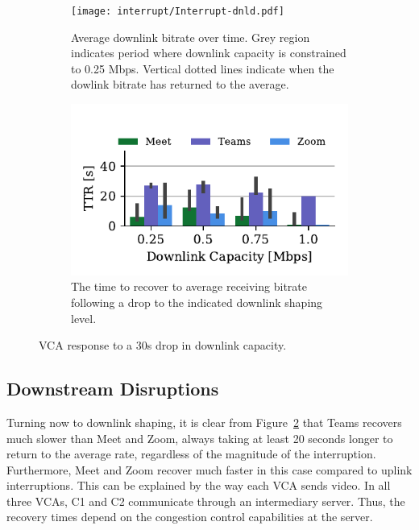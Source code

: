 \begin{figure}[t!]
 \centering
\begin{subfigure}[t]{.5\textwidth}
   \centering
    \texttt{[image: interrupt/Interrupt-dnld.pdf]}
    \caption{Average downlink bitrate over time. Grey region indicates period where downlink capacity is constrained to 0.25 Mbps. Vertical dotted lines indicate when the dowlink bitrate has returned to the average.}
    \label{fig:ts-dnld}
\end{subfigure}
\begin{subfigure}[t]{.5\textwidth}
  \centering
    \includegraphics[width=.9\textwidth,keepaspectratio]{figures/interrupt/TTR-dnld.pdf}
    \caption{The time to recover to average receiving bitrate following a drop to the indicated downlink shaping level.}
    \label{fig:TTR_dnld}
\end{subfigure}
\caption{VCA response to a 30s drop in downlink capacity.}
\label{fig:interrupt-dnld}
\end{figure}

\subsection{Downstream Disruptions}

Turning now to downlink shaping, it is clear from Figure~\ref{fig:TTR_dnld} that Teams recovers much slower than Meet and Zoom, always taking at least 20 seconds longer to return to the average rate, regardless of the magnitude of the interruption. Furthermore, Meet and Zoom recover much faster in this case compared to uplink interruptions. This can be explained by the way each VCA sends video. In all three VCAs, C1 and C2 communicate through an intermediary server. Thus, the recovery times depend on the congestion control capabilities at the server. 


